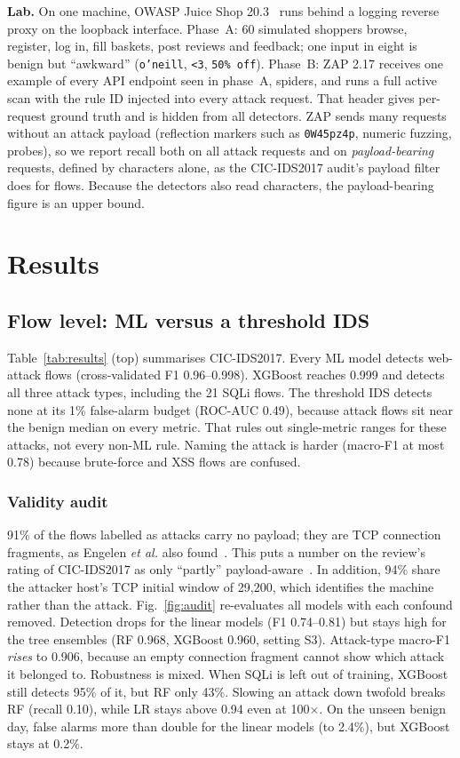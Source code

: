 \documentclass[conference]{IEEEtran}
\begin{document}
\textbf{Lab.} On one machine, OWASP Juice Shop 20.3~\cite{juiceshop} runs behind a logging reverse proxy
on the loopback interface. Phase~A: 60 simulated shoppers browse, register, log in, fill baskets, post
reviews and feedback; one input in eight is benign but ``awkward'' (\texttt{o'neill}, \texttt{<3},
\texttt{50\% off}). Phase~B: ZAP 2.17 receives one example of every API endpoint seen in phase~A,
spiders, and runs a full active scan with the rule ID injected into every attack request. That
header gives per-request ground truth and is hidden from all detectors.
ZAP sends many requests without an attack payload (reflection markers such as \texttt{0W45pz4p},
numeric fuzzing, probes), so we report recall both on all attack requests and on
\emph{payload-bearing} requests, defined by characters alone, as the CIC-IDS2017 audit's payload filter
does for flows. Because the detectors also read characters, the payload-bearing figure is an upper bound.

\section{Results}

\subsection{Flow level: ML versus a threshold IDS}

Table~\ref{tab:results} (top) summarises CIC-IDS2017. Every ML model detects web-attack flows
(cross-validated F1 0.96--0.998). XGBoost reaches 0.999 and detects all three attack types, including the
21 SQLi flows. The threshold IDS detects none at its 1\% false-alarm budget (ROC-AUC 0.49), because
attack flows sit near the benign median on every metric. That rules out single-metric ranges for these
attacks, not every non-ML rule. Naming the attack is harder (macro-F1 at most 0.78) because brute-force
and XSS flows are confused.

\subsubsection{Validity audit}
91\% of the flows labelled as attacks carry no payload; they are TCP connection
fragments, as Engelen \emph{et al.} also found~\cite{engelen2021}. This puts a number on the review's
rating of CIC-IDS2017 as only ``partly'' payload-aware~\cite{fasla2026}. In addition, 94\% share the attacker
host's TCP initial window of 29,200, which identifies the machine rather than the attack. Fig.~\ref{fig:audit}
re-evaluates all models with each confound removed. Detection drops for the linear models (F1 0.74--0.81) but
stays high for the tree ensembles (RF 0.968, XGBoost 0.960, setting S3). Attack-type macro-F1 \emph{rises}
to 0.906, because an empty connection fragment cannot show which attack it belonged to.
Robustness is mixed. When SQLi is left out of training, XGBoost still detects 95\% of it, but RF only 43\%.
Slowing an attack down twofold breaks RF (recall 0.10), while LR stays above 0.94 even at 100$\times$.
On the unseen benign day, false alarms more than double for the linear models (to 2.4\%), but XGBoost
stays at 0.2\%.
\end{document}
